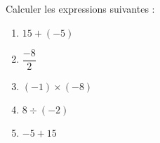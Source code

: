 
\begin{exercice}\label{exosmath-0898}

    Calculer les expressions suivantes :
    \begin{multicols}{2}
        \begin{enumerate}
            \item
                \( 15+(-5)\)
            \item
                \( \dfrac{ -8 }{ 2 }\)
            \item
                \( (-1)\times (-8)\)
            \item
                \( 8\div(-2)\)
            \item
                \( -5+15\)
        \end{enumerate}
    \end{multicols}

\end{exercice}

